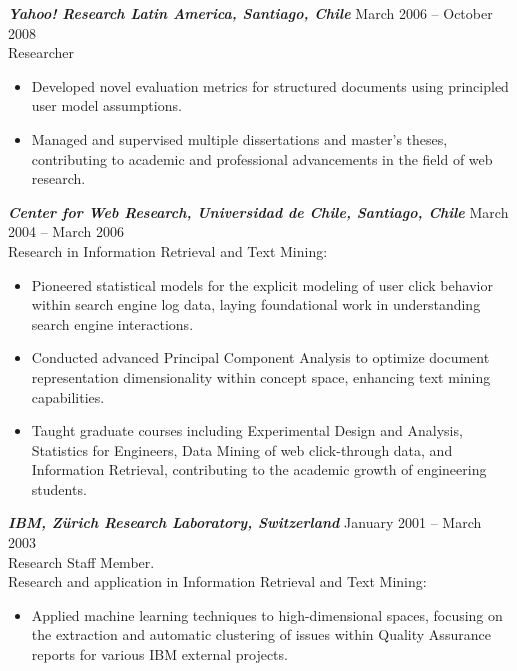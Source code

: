 \documentclass[10pt]{res} %
\begin{document}
\begin{resume}
{\sl \textbf{Yahoo! Research Latin America, Santiago, Chile}} \hfill March 2006 -- October 2008 \\
Researcher

\vspace{8pt}

\begin{itemize}
\item Developed novel evaluation metrics for structured documents
  using principled user model assumptions.
  
\item Managed and supervised multiple dissertations and master's
  theses, contributing to academic and professional advancements in
  the field of web research.
\end{itemize}

{\sl \textbf{Center for Web Research, Universidad de Chile, Santiago, Chile}} \hfill March 2004 -- March 2006 \\
Research in Information Retrieval and Text Mining:

\vspace{8pt}

\begin{itemize}
\item Pioneered statistical models for the explicit modeling of user
  click behavior within search engine log data, laying foundational
  work in understanding search engine interactions.
  
\item Conducted advanced Principal Component Analysis to optimize
  document representation dimensionality within concept space,
  enhancing text mining capabilities.
  
\item Taught graduate courses including Experimental Design and
  Analysis, Statistics for Engineers, Data Mining of web click-through
  data, and Information Retrieval, contributing to the academic growth
  of engineering students.
\end{itemize}

{\sl \textbf{IBM, Z\"urich Research Laboratory, Switzerland}} \hfill January 2001 -- March 2003 \\
Research Staﬀ Member.\\
Research and application in Information Retrieval and Text Mining:

\vspace{8pt}

\begin{itemize}
\item Applied machine learning techniques to high-dimensional spaces,
  focusing on the extraction and automatic clustering of issues within
  Quality Assurance reports for various IBM external projects.
 

\end{itemize}
\end{resume}
\end{document}
